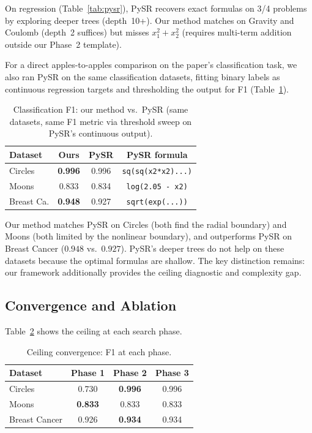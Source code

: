 \documentclass[journal]{IEEEtran}
\begin{document}
On regression (Table~\ref{tab:pysr}), PySR recovers exact formulas on
3/4 problems by exploring deeper trees (depth~10+). Our method matches
on Gravity and Coulomb (depth~2 suffices) but misses $x_1^2 + x_2^2$
(requires multi-term addition outside our Phase~2 template).

For a direct apples-to-apples comparison on the paper's classification
task, we also ran PySR on the same classification datasets, fitting
binary labels as continuous regression targets and thresholding the
output for F1 (Table~\ref{tab:pysr_class}).

\begin{table}[h]
\caption{Classification F1: our method vs.\ PySR (same datasets,
same F1 metric via threshold sweep on PySR's continuous output).}
\label{tab:pysr_class}
\scriptsize
\begin{tabular}{@{}lccc@{}}
\toprule
Dataset & Ours & PySR & PySR formula \\
\midrule
Circles & \textbf{0.996} & 0.996 & \texttt{sq(sq(x2*x2)...)} \\
Moons & 0.833 & 0.834 & \texttt{log(2.05 - x2)} \\
Breast Ca. & \textbf{0.948} & 0.927 & \texttt{sqrt(exp(...))} \\
\bottomrule
\end{tabular}
\end{table}

Our method matches PySR on Circles (both find the radial boundary)
and Moons (both limited by the nonlinear boundary), and outperforms
PySR on Breast Cancer ($0.948$ vs.\ $0.927$). PySR's deeper trees do
not help on these datasets because the optimal formulas are shallow.
The key distinction remains: our framework additionally provides the
ceiling diagnostic and complexity gap.

\subsection{Convergence and Ablation}

Table~\ref{tab:convergence} shows the ceiling at each search phase.

\begin{table}[h]
\caption{Ceiling convergence: F1 at each phase.}
\label{tab:convergence}
\small
\begin{tabular}{lccc}
\toprule
Dataset & Phase 1 & Phase 2 & Phase 3 \\
\midrule
Circles & 0.730 & \textbf{0.996} & 0.996 \\
Moons & \textbf{0.833} & 0.833 & 0.833 \\
Breast Cancer & 0.926 & \textbf{0.934} & 0.934 \\
\bottomrule
\end{tabular}
\end{table}
\end{document}

